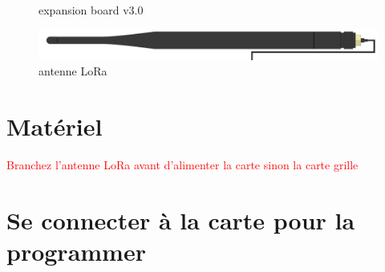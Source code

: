 \documentclass{article}
\begin{document}
\begin{figure}[H]
\begin{minipage}[b]{0.4\textwidth}
    \caption{expansion board v3.0}
  \end{minipage}
\end{figure}

    \begin{figure}[H]
\begin{center}
\advance\leftskip-3cm
\advance\rightskip-3cm
\includegraphics[keepaspectratio=true,scale=0.2]{lora_antenna.png}
\caption{antenne LoRa}
\label{visina8}
\end{center}\end{figure}


\section{Matériel}
\textcolor{red}{Branchez l'antenne LoRa avant d'alimenter la carte sinon la carte grille}


\section{Se connecter à la carte pour la programmer}

\end{document}
